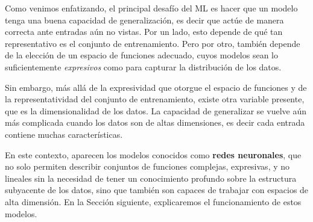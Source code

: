 \documentclass[../../main.tex]{subfiles}
\begin{document}
\bigskip
Como venimos enfatizando, el principal desafío del ML es hacer que un modelo tenga una
buena capacidad de generalización, es decir que actúe de manera correcta ante entradas aún
no vistas. Por un lado, esto depende de qué tan representativo es el conjunto de
entrenamiento. Pero por otro, también depende de la elección de un espacio de
funciones adecuado, cuyos modelos sean lo suficientemente \textit{expresivos} como para
capturar la distribución de los datos.

Sin embargo, más allá de la expresividad que otorgue el espacio de funciones y de la
representatividad del conjunto de entrenamiento, existe otra variable presente, que es la
dimensionalidad de los datos. La capacidad de generalizar se vuelve aún más complicada
cuando los datos son de altas dimensiones, es decir cada entrada contiene muchas
características.

En este contexto, aparecen los modelos conocidos como \textbf{redes neuronales}, que no
solo permiten describir conjuntos de funciones complejas, expresivas, y no lineales sin la
necesidad de tener un conocimiento profundo sobre la estructura subyacente de los datos,
sino que también son capaces de trabajar con espacios de alta dimensión. En la Sección
siguiente, explicaremos el funcionamiento de estos modelos.
\end{document}
